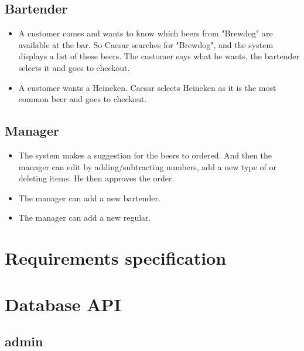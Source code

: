 \documentclass{article}
\begin{document}
\subsection{Bartender}

\begin{itemize}
\item A customer comes and wants to know which beers from "Brewdog" are available at the bar. So Caesar searches for "Brewdog", and the system displays a list of these beers. The customer says what he wants, the bartender selects it and goes to checkout.
\item A customer wants a Heineken. Caesar selects Heineken as it is the most common beer and goes to checkout.

\end{itemize}
\subsection{Manager}

\begin{itemize}
\item The system makes a suggestion for the beers to ordered. And then the manager can edit by adding/subtracting numbers, add a new type of or deleting items. He then approves the order.
\item The manager can add a new bartender.
\item The manager can add a new regular.

\end{itemize}
\section{Requirements specification}
\section{Database API}
\subsection{admin}
\end{document}
